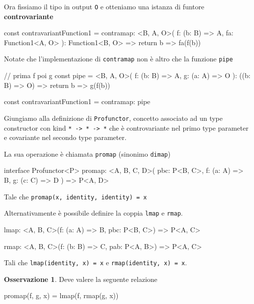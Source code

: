 \documentclass[12pt]{article}
\theoremstyle{definition}
\newtheorem{observation}{Osservazione}[section]
\newenvironment{code}
  {\vspace{0.5cm} \VerbatimEnvironment\begin{typescriptcode}}
  {\end{typescriptcode} \vspace{0.2cm}}
\begin{document}
Ora fissiamo il tipo in output \texttt{O} e otteniamo una istanza di funtore \textbf{controvariante}

\begin{code}
const contravariantFunction1 = {
  contramap: <B, A, O>(
    f: (b: B) => A,
    fa: Function1<A, O>
  ): Function1<B, O> => {
    return b => fa(f(b))
  }
}
\end{code}

Notate che l'implementazione di \texttt{contramap} non è altro che la funzione \texttt{pipe}

\begin{code}
// prima f poi g
const pipe = <B, A, O>(
  f: (b: B) => A,
  g: (a: A) => O
): ((b: B) => O) => {
  return b => g(f(b))
}

const contravariantFunction1 = {
  contramap: pipe
}
\end{code}

Giungiamo alla definizione di \texttt{Profunctor}, concetto associato ad un type constructor con kind \texttt{* -> * -> *} che è
controvariante nel primo type parameter e covariante nel secondo type parameter.

La sua operazione è chiamata \texttt{promap} (sinonimo \texttt{dimap})

\begin{code}
interface Profunctor<P> {
  promap: <A, B, C, D>(
    pbc: P<B, C>,
    f: (a: A) => B,
    g: (c: C) => D
  ) => P<A, D>
}
\end{code}

Tale che \texttt{promap(x, identity, identity) = x}

Alternativamente è possibile definire la coppia \texttt{lmap} e \texttt{rmap}.

\begin{code}
lmap: <A, B, C>(f: (a: A) => B, pbc: P<B, C>) => P<A, C>

rmap: <A, B, C>(f: (b: B) => C, pab: P<A, B>) => P<A, C>
\end{code}

Tali che \texttt{lmap(identity, x) = x} e \texttt{rmap(identity, x) = x}.

\begin{observation}
Deve valere la seguente relazione

\begin{code}
promap(f, g, x) = lmap(f, rmap(g, x))
\end{code}
\end{observation}

\newpage
\end{document}
